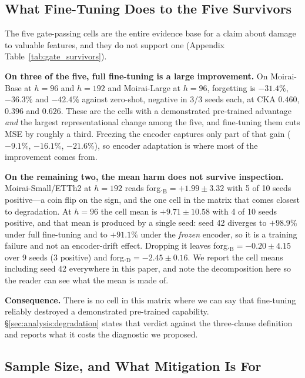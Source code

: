 \subsection{What Fine-Tuning Does to the Five Survivors}
\label{sec:forecasting:results}

The five gate-passing cells are the entire evidence base for a claim about
damage to valuable features, and they do not support one
(Appendix Table~\ref{tab:gate_survivors}).

\textbf{On three of the five, full fine-tuning is a large improvement.} On
Moirai-Base at $h{=}96$ and $h{=}192$ and Moirai-Large at $h{=}96$,
forgetting is $-31.4\%$, $-36.3\%$ and $-42.4\%$ against zero-shot, negative
in 3/3 seeds each, at CKA $0.460$, $0.396$ and $0.626$.  These are the
cells with a demonstrated pre-trained advantage \emph{and} the largest
representational change among the five, and fine-tuning them cuts MSE by
roughly a third.  Freezing the encoder captures only part of that gain
($-9.1\%$, $-16.1\%$, $-21.6\%$), so encoder adaptation is where most of the
improvement comes from.

\textbf{On the remaining two, the mean harm does not survive inspection.}
Moirai-Small/ETTh2 at $h{=}192$ reads forg.$_\text{B}{=}{+}1.99{\pm}3.32$
with 5 of 10 seeds positive---a coin flip on the sign, and the one cell in the
matrix that comes closest to degradation.  At $h{=}96$ the cell mean is
$+9.71{\pm}10.58$ with 4 of 10 seeds positive, and that mean is produced by a
single seed: seed 42 diverges to $+98.9\%$ under full fine-tuning and to
$+91.1\%$ under the \emph{frozen} encoder, so it is a training failure and not
an encoder-drift effect.  Dropping it leaves
forg.$_\text{B}{=}{-}0.20{\pm}4.15$ over 9 seeds (3 positive) and
forg.$_\text{D}{=}{-}2.45{\pm}0.16$.  We report the cell means including seed
42 everywhere in this paper, and note the decomposition here so the reader can
see what the mean is made of.

\textbf{Consequence.}  There is no cell in this matrix where we can say that
fine-tuning reliably destroyed a demonstrated pre-trained capability.
\S\ref{sec:analysis:degradation} states that verdict against the three-clause
definition and reports what it costs the diagnostic we proposed.

\subsection{Sample Size, and What Mitigation Is For}
\label{sec:forecasting:replication}

